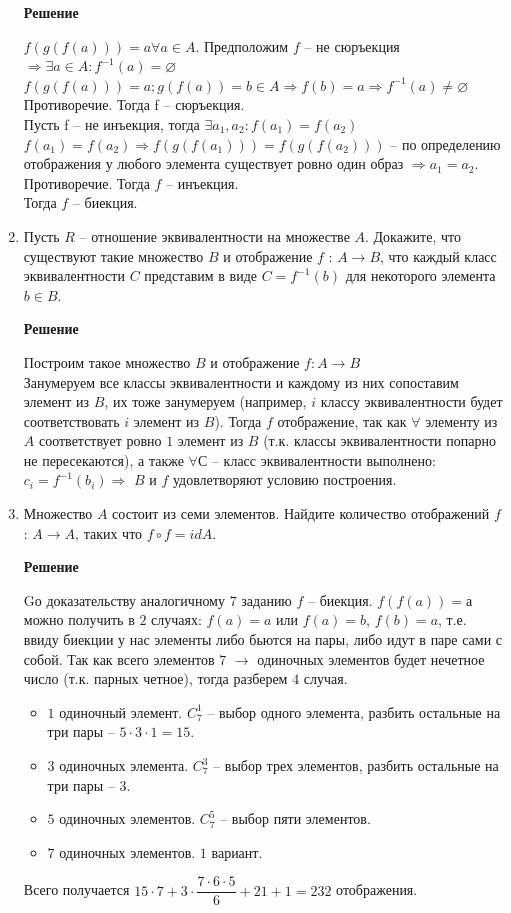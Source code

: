 \documentclass[12pt]{article}
\begin{document}
\begin{enumerate}[label={\textbf{\arabic{section}.\arabic*}}]
		\textbf{Решение}
		
		$f(g(f(a))) = a \forall a \in A$.
		Предположим $f$ -- не сюръекция $\Rightarrow \exists a \in A : f^{-1}(a) = \varnothing$ 
		$f(g(f(a))) = a; g(f(a)) = b \in A \Rightarrow f(b)  = a \Rightarrow f^{-1}(a) \not = \varnothing$\\ Противоречие.
		Тогда f -- сюръекция. \\
		Пусть f -- не инъекция, тогда $\exists a_1, a_2: f(a_1) = f(a_2)$
		$f(a_1) = f(a_2) \Rightarrow f(g(f(a_1))) = f(g(f(a_2)))$ -- по определению отображения у любого элемента существует ровно один образ $\Rightarrow a_1 = a_2$. Противоречие. Тогда $f$ -- инъекция.\\
		Тогда $f$ -- биекция.
		
		\item Пусть $R$ -- отношение эквивалентности на множестве $A$. Докажите, что существуют такие множество $B$ и отображение $f$ : $A\rightarrow B$, что каждый класс эквивалентности $C$ представим в виде $C = f^{-1}(b)$ для некоторого элемента $b\in B$.
		
		\textbf{Решение}
		
		Построим такое множество $B$ и отображение $f: A \rightarrow B$\\
		Занумеруем все классы эквивалентности и каждому из них сопоставим элемент из $B$, их тоже занумеруем (например, $i$ классу эквивалентности будет соответствовать $i$ элемент из $B$). Тогда $f$ отображение, так как $\forall$  элементу из $A$ соответствует ровно $1$ элемент из $B$ (т.к. классы эквивалентности попарно не пересекаются), а также $ \forall С$ -- класс эквивалентности выполнено: $c_i = f^{-1}(b_i) \Rightarrow$ $B$ и $f$ удовлетворяют условию построения.
		
		\item Множество $A$ состоит из семи элементов. Найдите количество отображений $f$ : $A\rightarrow A$, таких что $f\circ f = idA$.
		
		\textbf{Решение}
		
		Gо доказательству аналогичному $7$ заданию $f$ -- биекция. $f(f(a)) = а$ можно получить в $2$ случаях: $f(a) = a$ или $f(a) = b$, $f(b) = a$, т.е. ввиду биекции у нас элементы либо бьются на пары, либо идут в паре сами с собой. Так как всего элементов $7$ $\rightarrow$ одиночных элементов будет нечетное число (т.к. парных четное), тогда разберем $4$ случая.
		\begin{itemize}
			\item $1$ одиночный элемент. $C_7^1$ -- выбор одного элемента, разбить остальные на три пары -- $5\cdot 3 \cdot 1 = 15$.
			\item $3$ одиночных элемента. $C_7^3$ -- выбор трех элементов, разбить остальные на три пары -- $3$.
			\item $5$ одиночных элементов. $C_7^5$ -- выбор пяти элементов.
			\item $7$ одиночных элементов. $1$ вариант.
		\end{itemize}
		Всего получается $15\cdot 7 + 3\cdot \dfrac{7\cdot 6 \cdot 5}{6} + 21 + 1 = 232$ отображения.
	\end{enumerate}
	\newpage
\end{document}

